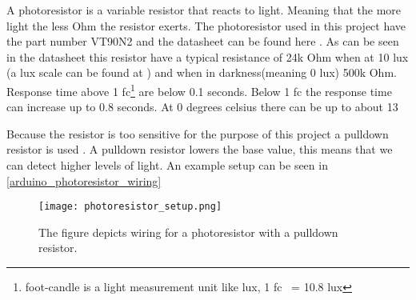 A photoresistor is a variable resistor that reacts to light. Meaning that the more light the less Ohm the resistor exerts. The photoresistor used in this project have the part number VT90N2 and the datasheet can be found here \cite{photoresistor_sheet}. As can be seen in the datasheet this resistor have a typical resistance of 24k Ohm when at 10 lux (a lux scale can be found at \cite{lux_scale}) and when in darkness(meaning 0 lux) 500k Ohm. Response time above 1 fc\footnote{foot-candle is a light measurement unit like lux, 1 fc ~= 10.8 lux} are below 0.1 seconds. Below 1 fc the response time can increase up to 0.8 seconds. At 0 degrees celsius there can be up to about 13%

Because the resistor is too sensitive for the purpose of this project a pulldown resistor is used \cite{pulldown_resistor}. A pulldown resistor lowers the base value, this means that we can detect higher levels of light. An example setup can be seen in \cref{arduino_photoresistor_wiring}
\begin{figure}[htbp]
  \centering
  \texttt{[image: photoresistor\_setup.png]}
  \caption{The figure depicts wiring for a photoresistor with a pulldown resistor.}
  \label{fig:arduino_photoresistor_wiring}
\end{figure}